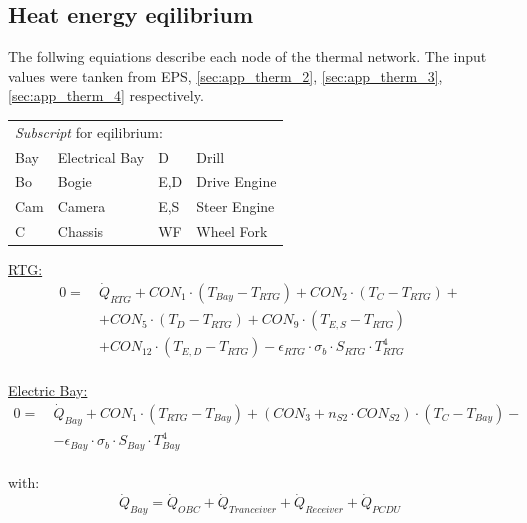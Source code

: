 \subsection{Heat energy eqilibrium}  \label{sec:app_tcs_01}
The follwing equiations describe each node of the thermal network.
The input values were tanken from EPS, \autoref{sec:app_therm_2}, \autoref{sec:app_therm_3}, \autoref{sec:app_therm_4} respectively.

\begin{table}[H]
	\begin{tabular}{l@{\quad}l@{\qquad\qquad\qquad}l@{\quad}l}
		\multicolumn{4}{l}{\textit{Subscript} for eqilibrium:}\\[0.5em]
		Bay & Electrical Bay & D	& Drill\\
		Bo & Bogie & 	E,D & Drive Engine\\
		Cam & Camera & E,S & Steer Engine\\
		C & Chassis & WF & Wheel Fork\\
	\end{tabular}

\end{table}

\underline{RTG:}
\begin{equation}
\begin{aligned}
0=\  &\dot{Q}_{RTG} +CON_1 \cdot (T_{Bay}-T_{RTG})+CON_2 \cdot (T_{C}-T_{RTG})+ \\[1em]
& + CON_5 \cdot (T_{D}-T_{RTG})+ CON_9 \cdot (T_{E,S}-T_{RTG})\\[1em]
& +   CON_12 \cdot (T_{E,D}-T_{RTG}) - \epsilon_{RTG}\cdot \sigma_b \cdot S_{RTG}\cdot T_{RTG}^4 \\[2em]
\end{aligned}
\end{equation}

\underline{Electric Bay:}
\begin{equation}
	\begin{aligned}
		0=\ &  \dot{Q}_{Bay}+ CON_1 \cdot (T_{RTG}-T_{Bay})+ (CON_3+n_{S2}\cdot CON_{S2}) \cdot (T_{C}-T_{Bay})-\\[1em]
		&  -\epsilon_{Bay}\cdot \sigma_b \cdot S_{Bay}\cdot T_{Bay}^4
	\end{aligned}
\end{equation}\\
with: 
\begin{equation} \dot{Q}_{Bay} = \dot{Q}_{OBC} + \dot{Q}_{Tranceiver} +\dot{Q}_{Receiver} +\dot{Q}_{PCDU} \end{equation}\\

